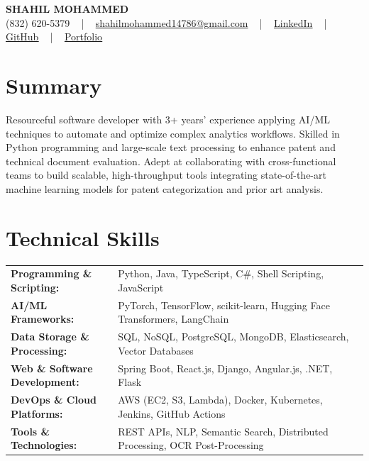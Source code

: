 \documentclass[letterpaper,11pt]{article}
\begin{document}
\begin{center}
    {\fontsize{14pt}{12pt}\selectfont \textbf{\MakeUppercase{Shahil Mohammed}}}\\ \vspace{2pt}
    \fontsize{10pt}{12pt}\selectfont (832) 620-5379 ~ | ~ \href{mailto:shahilmohammed14786@gmail.com}{shahilmohammed14786@gmail.com} ~ | ~  
    \href{https://www.linkedin.com/in/shahil-mohammed-9652931a1/}{\color{blue}\underline{LinkedIn}}  ~ | ~ 
    \href{https://github.com/freakbeast14}{\color{blue}\underline{GitHub}} ~ | ~ 
    \href{https://shahil-mohammed.netlify.app/}{\color{blue}\underline{Portfolio}}
    \vspace{-8pt}
\end{center}

\section{Summary}
\fontsize{9pt}{10pt}\selectfont
Resourceful software developer with 3+ years’ experience applying AI/ML techniques to automate and optimize complex analytics workflows. Skilled in Python programming and large-scale text processing to enhance patent and technical document evaluation. Adept at collaborating with cross-functional teams to build scalable, high-throughput tools integrating state-of-the-art machine learning models for patent categorization and prior art analysis.
 \vspace{-5pt}
 
\section{Technical Skills}
        \vspace{-14pt}
        \begin{table}[h]
            \fontsize{9pt}{10pt}\selectfont
            \begin{tabular}{p{0.3\linewidth} p{0.7\linewidth}}
                \textbf{Programming \& Scripting:} & Python, Java, TypeScript, C\#, Shell Scripting, JavaScript \\
                \textbf{AI/ML Frameworks:} & PyTorch, TensorFlow, scikit-learn, Hugging Face Transformers, LangChain \\
                \textbf{Data Storage \& Processing:} & SQL, NoSQL, PostgreSQL, MongoDB, Elasticsearch, Vector Databases \\
                \textbf{Web \& Software Development:} & Spring Boot, React.js, Django, Angular.js, .NET, Flask \\
                \textbf{DevOps \& Cloud Platforms:} & AWS (EC2, S3, Lambda), Docker, Kubernetes, Jenkins, GitHub Actions \\
                \textbf{Tools \& Technologies:} & REST APIs, NLP, Semantic Search, Distributed Processing, OCR Post-Processing \\
            \end{tabular}
        \end{table}
 \vspace{-15pt}
 
\end{document}
